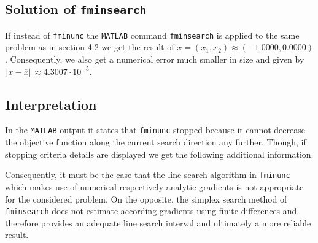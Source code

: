 \documentclass{article}
\begin{document}
	\subsection{Solution of \texttt{fminsearch}}
	If instead of \texttt{fminunc} the \texttt{MATLAB} command \texttt{fminsearch} is applied to the same problem as in section 4.2 we get the result of $x=(x_1,x_2)\approx(-1.0000,0.0000)$. Consequently, we also get a numerical error much smaller in size and given by $\Vert x - \overline{x}\Vert \approx 4.3007\cdot 10^{-5}$.
	\subsection{Interpretation}
	In the \texttt{MATLAB} output it states that \texttt{fminunc} stopped because it cannot decrease the objective function along the current search direction any further. Though, if stopping criteria details are displayed we get the following additional information.
	
	Consequently, it must be the case that the line search algorithm in \texttt{fminunc} which makes use of numerical respectively analytic gradients is not appropriate for the considered problem. On the opposite, the simplex search method of \texttt{fminsearch} does not estimate according gradients using finite differences and therefore provides an adequate line search interval and ultimately a more reliable result. 
\end{document}
